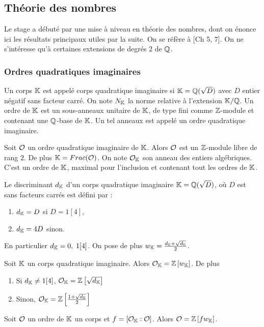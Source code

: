 \subsection{Théorie des nombres}
 Le stage a débuté par une mise à niveau en théorie des nombres, dont on énonce ici les résultats principaux utiles par la suite. On se réfère à \cite{Cox}[Ch 5, 7]. On ne s'intéresse qu'à certaines extensions de degrés $2$ de $\mathbb{Q}$.

\subsubsection{Ordres quadratiques imaginaires}

\begin{Def}
	
	Un corps $\mathbb{K}$ est appelé corps quadratique imaginaire si $\mathbb{K} = \mathbb{Q}(\sqrt{D})$ avec $D$ entier négatif sans facteur carré. On note $N_{\mathbb{K}}$ la norme relative à l'extension $\mathbb{K}/\mathbb{Q}$. Un ordre de $\mathbb{K}$ est un sous-anneaux unitaire de $\mathbb{K}$, de type fini comme $\mathbb{Z}$-module et contenant une $\mathbb{Q}$-base de $\mathbb{K}$. Un tel anneaux est appelé un ordre quadratique imaginaire. 
\end{Def}

\begin{Prop}
	
	Soit $\mathcal{O}$ un ordre quadratique imaginaire de $\mathbb{K}$. Alors $\mathcal{O}$ est un $\mathbb{Z}$-module libre de rang $2$. De plus $\mathbb{K} = Frac(\mathcal{O})$.
	On note $\mathcal{O}_{\mathbb{K}}$ son anneau des entiers algébriques. C'est un ordre de $\mathbb{K}$, maximal pour l'inclusion et contenant tout les ordres de $\mathbb{K}$. 
\end{Prop}

\begin{Def}
	Le discriminant $d_{\mathbb{K}}$ d'un corps quadratique imaginaire $\mathbb{K} = \mathbb{Q}(\sqrt{D})$, où $D$ est sans facteurs carrés est défini par :
	\begin{enumerate}
		\item $d_{\mathbb{K}} = D$ si $D = 1 [4]$,
		\item $d_{\mathbb{K}} = 4D$ sinon.
	\end{enumerate}
	En particulier $d_{\mathbb{K}} = 0 ,\;1[4]$. On pose de plus $w_{\mathbb{K}} = \frac{d_{\mathbb{K}} + \sqrt{d_{\mathbb{K}}}}{2}$.
	
\end{Def}


\begin{Prop}\label{baseOrdreWk}
	
	Soit $\mathbb{K}$ un corps quadratique imaginaire. Alors $\mathcal{O}_{\mathbb{K}} = \mathbb{Z}\left[ w_{\mathbb{K}}\right] $. De plus
	\begin{enumerate}
		\item Si $d_{\mathbb{K}} \neq 1 [4]$, $\mathcal{O}_{\mathbb{K}} = \mathbb{Z}\left[ \sqrt{d_{\mathbb{K}}}\right] $
		\item Sinon, $\mathcal{O}_{\mathbb{K}} = \mathbb{Z}\left[ \frac{1 + \sqrt{d_{\mathbb{K}}}}{2}\right] $
	\end{enumerate} 
	Soit $\mathcal{O}$ un ordre de $\mathbb{K}$ un corps et $f = \left[ \mathcal{O}_{\mathbb{K}} : \mathcal{O}\right]$. Alors $\mathcal{O} = \mathbb{Z}\left[ fw_{\mathbb{K}}\right] $.  
\end{Prop}


